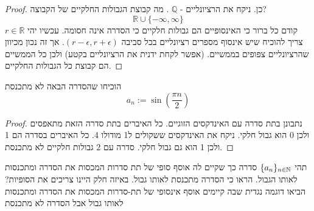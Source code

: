 \documentclass{article}
\begin{document}
\begin{proof}
כן. ניקח את הרציונליים - 
$\mathbb{Q}$
. מה קבוצת הגבולות החלקיים של הקבוצה?
\[\mathbb{R}\cup\{-\infty,\infty\}\]
קודם כל ברור כי האינסופיים הם גבולות חלקיים כי הסדרה אינה חסומה. עכשיו יהי 
$r\in\mathbb{R}$
צריך להוכיח שיש אינסוף מספרים רציונליים בכל סביבה 
$(r-\epsilon, r+\epsilon)$.
אך זה נכון מכיוון שהרציונליים צפופים בממשיים. (אפשר לקחת ידנית את הרציונליים בקטע) ולכן כל הממשיים הם קבוצת כל הגבולות החלקיים. 
\end{proof}

\begin{exercise}
הוכיחו שהסדרה הבאה לא מתכנסת 
\[a_n:=\sin\left(\frac{\pi n}{2}\right)\]
\end{exercise}

\begin{proof}
נתבונן בתת סדרה עם האינדקסים הזוגיים. כל האיברים בתת סדרה הזאת מתאפסים ולכן 0 הוא גבול חלקי. ניקח את האינדקסים ששקולים ל1 מודולו 4. כל האיברים בסדרה הם 1 ולכן 1 הוא גם גבול חלקי. סדרה עם 2 גבולות חלקיים לא מתכנסת. 
\end{proof}

\begin{exercise}
תהי 
$\{a_n\}_{n\in\mathbb{N}}$
סדרה כך שקיים לה אוסף סופי של תת סדרות המכסות את הסדרה ומתכנסות לאותו הגבול. הראו כי הסדרה מתכנסת לאותו גבול. באיזה חלק היינו צריכים את הסופיות? הביאו דוגמה נגדית שבה קיימים אוסף אינסופי של תת-סדרות המכסות את הסדרה ומתכנסות לאותו גבול אבל הסדרה לא מתכנסת
\end{exercise}
\end{document}
